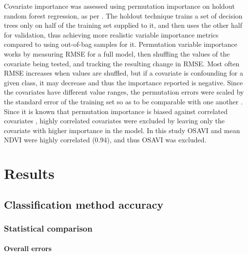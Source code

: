 \documentclass[a4paper,12pt]{scrbook}
\begin{document}
Covariate importance was assessed using permutation importance on holdout random forest regression, as per \citet{Janitza2016holdoutrf}. The holdout technique trains a set of decision trees only on half of the training set supplied to it, and then uses the other half for validation, thus achieving more realistic variable importance metrics compared to using out-of-bag samples for it. Permutation variable importance works by measuring RMSE for a full model, then shuffling the values of the covariate being tested, and tracking the resulting change in RMSE. Most often RMSE increases when values are shuffled, but if a covariate is confounding for a given class, it may decrease and thus the importance reported is negative. Since the covariates have different value ranges, the permutation errors were scaled by the standard error of the training set so as to be comparable with one another \citep{breiman2001random}. Since it is known that permutation importance is biased against correlated covariates \citep{tolosi2011importancebias}, highly correlated covariates were excluded by leaving only the covariate with higher importance in the model. In this study OSAVI and mean NDVI were highly correlated (0.94), and thus OSAVI was excluded.

\chapter{Results}

\section{Classification method accuracy}

\subsection{Statistical comparison}

\subsubsection{Overall errors}
\end{document}
